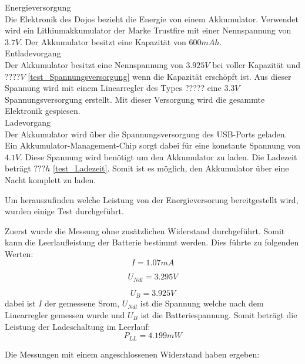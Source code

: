 Energieversorgung\\
Die Elektronik des Dojos bezieht die Energie von einem Akkumulator. Verwendet wird ein Lithiumakkumulator der Marke Trustfire mit einer Nennspannung von $3.7V$. Der Akkumulator besitzt eine Kapazität von $600mAh$.\\

Entladevorgang\\ 
Der Akkumulator besitzt eine Nennspannung von $3.925V$ bei voller Kapazität und $????V$ \ref{test_Spannungsversorgung} wenn die Kapazität erschöpft ist. Aus dieser Spannung wird mit einem Linearregler des Types ????? eine $3.3V$ Spannungsversorgung erstellt. Mit dieser Versorgung wird die gesammte Elektronik gespiesen.\\

Ladevorgang\\
Der Akkumulator wird über die Spannungsversorgung des USB-Ports geladen. Ein Akkumulator-Management-Chip sorgt dabei für eine konstante Spannung von $4.1V$. Diese Spannung wird benötigt um den Akkumulator zu laden. Die Ladezeit beträgt $???h$ \ref{test_Ladezeit}. Somit ist es möglich, den Akkumulator über eine Nacht komplett zu laden. 


Um herauszufinden welche Leistung von der Energieversorung bereitgestellt wird, wurden einige Test durchgeführt.

Zuerst wurde die Messung ohne zusätzlichen Widerstand durchgeführt. Somit kann die Leerlaufleistung der Batterie bestimmt werden. Dies führte zu folgenden Werten:
\begin{equation}
I = 1.07mA
\end{equation}

\begin{equation}
U_{Ndl} = 3.295V
\end{equation}

\begin{equation}
U_{B} = 3.925V
\end{equation}
dabei ist $I$ der gemessene Srom, $U_{Ndl}$ ist die Spannung welche nach dem Linearregler gemessen wurde und $U_{B}$ ist die Batteriespannung. Somit beträgt die Leistung der Ladeschaltung im Leerlauf:
\begin{equation}
P_{LL}  = 4.199mW
\end{equation}

Die Messungen mit einem angeschlossenen Widerstand haben ergeben: \\

